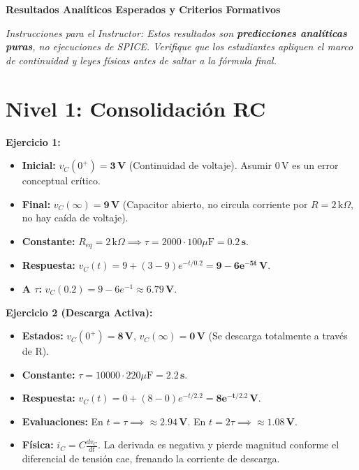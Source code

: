 \documentclass[11pt, a4paper]{article}
\begin{document}
\begin{tcolorbox}[colback=ucbblue!5!white, colframe=ucbblue, title=\textbf{Clave Docente Exclusiva: Ejercicios de Fin de Semana (W11)}]
    \centering \textbf{Resultados Analíticos Esperados y Criterios Formativos}
\end{tcolorbox}

\noindent\textit{Instrucciones para el Instructor: Estos resultados son \textbf{predicciones analíticas puras}, no ejecuciones de SPICE. Verifique que los estudiantes apliquen el marco de continuidad y leyes físicas antes de saltar a la fórmula final.}

\vspace{0.3cm}
\section*{Nivel 1: Consolidación RC}

\textbf{Ejercicio 1:}
\begin{itemize}\setlength\itemsep{0em}
    \item \textbf{Inicial:} $v_C(0^+) = \mathbf{3\,\text{V}}$ (Continuidad de voltaje). Asumir $0\,\text{V}$ es un error conceptual crítico.
    \item \textbf{Final:} $v_C(\infty) = \mathbf{9\,\text{V}}$ (Capacitor abierto, no circula corriente por $R=2\,\text{k}\Omega$, no hay caída de voltaje).
    \item \textbf{Constante:} $R_{eq} = 2\,\text{k}\Omega \implies \tau = 2000 \cdot 100\mu\text{F} = \mathbf{0.2\,\text{s}}$.
    \item \textbf{Respuesta:} $v_C(t) = 9 + (3 - 9)e^{-t/0.2} = \mathbf{9 - 6e^{-5t}\,\text{V}}$.
    \item \textbf{A $\tau$:} $v_C(0.2) = 9 - 6e^{-1} \approx \mathbf{6.79\,\text{V}}$.
\end{itemize}

\textbf{Ejercicio 2 (Descarga Activa):}
\begin{itemize}\setlength\itemsep{0em}
    \item \textbf{Estados:} $v_C(0^+) = \mathbf{8\,\text{V}}$, $v_C(\infty) = \mathbf{0\,\text{V}}$ (Se descarga totalmente a través de R).
    \item \textbf{Constante:} $\tau = 10000 \cdot 220\mu\text{F} = \mathbf{2.2\,\text{s}}$.
    \item \textbf{Respuesta:} $v_C(t) = 0 + (8 - 0)e^{-t/2.2} = \mathbf{8e^{-t/2.2}\,\text{V}}$.
    \item \textbf{Evaluaciones:} En $t=\tau \implies \approx \mathbf{2.94\,\text{V}}$. En $t=2\tau \implies \approx \mathbf{1.08\,\text{V}}$.
    \item \textbf{Física:} $i_C = C \frac{dv_C}{dt}$. La derivada es negativa y pierde magnitud conforme el diferencial de tensión cae, frenando la corriente de descarga.
\end{itemize}
\end{document}
